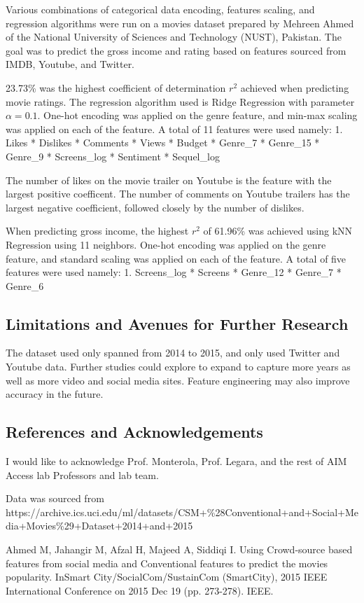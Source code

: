 \documentclass[11pt]{article}
\begin{document}
    Various combinations of categorical data encoding, features scaling, and
regression algorithms were run on a movies dataset prepared by Mehreen
Ahmed of the National University of Sciences and Technology (NUST),
Pakistan. The goal was to predict the gross income and rating based on
features sourced from IMDB, Youtube, and Twitter.

23.73\% was the highest coefficient of determination \(r^2\) achieved
when predicting movie ratings. The regression algorithm used is Ridge
Regression with parameter \(\alpha = 0.1\). One-hot encoding was applied
on the genre feature, and min-max scaling was applied on each of the
feature. A total of 11 features were used namely: 1. Likes * Dislikes *
Comments * Views * Budget * Genre\_7 * Genre\_15 * Genre\_9 *
Screens\_log * Sentiment * Sequel\_log

The number of likes on the movie trailer on Youtube is the feature with
the largest positive coefficent. The number of comments on Youtube
trailers has the largest negative coefficient, followed closely by the
number of dislikes.

When predicting gross income, the highest \(r^2\) of 61.96\% was
achieved using kNN Regression using 11 neighbors. One-hot encoding was
applied on the genre feature, and standard scaling was applied on each
of the feature. A total of five features were used namely: 1.
Screens\_log * Screens * Genre\_12 * Genre\_7 * Genre\_6

    \subsection{Limitations and Avenues for Further
Research}\label{limitations-and-avenues-for-further-research}

    The dataset used only spanned from 2014 to 2015, and only used Twitter
and Youtube data. Further studies could explore to expand to capture
more years as well as more video and social media sites. Feature
engineering may also improve accuracy in the future.

    \subsection{References and
Acknowledgements}\label{references-and-acknowledgements}

    I would like to acknowledge Prof. Monterola, Prof. Legara, and the rest
of AIM Access lab Professors and lab team.

Data was sourced from
https://archive.ics.uci.edu/ml/datasets/CSM+\%28Conventional+and+Social+Media+Movies\%29+Dataset+2014+and+2015

Ahmed M, Jahangir M, Afzal H, Majeed A, Siddiqi I. Using Crowd-source
based features from social media and Conventional features to predict
the movies popularity. InSmart City/SocialCom/SustainCom (SmartCity),
2015 IEEE International Conference on 2015 Dec 19 (pp. 273-278). IEEE.


    
    
    
    
\end{document}
